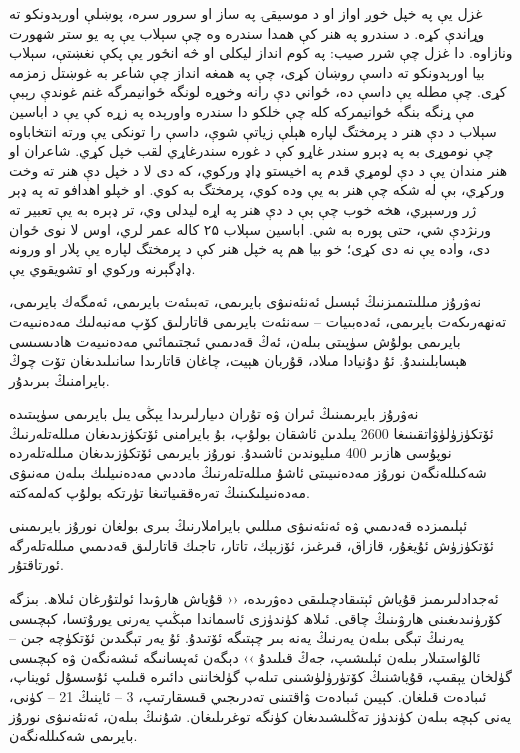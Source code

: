 \documentclass[a4paper]{article}
\begin{document}
\begin{flushright}
غزل یې په خپل خوږ اواز او د موسیقۍ په ساز او سرور سره، پوښلې اورېدونکو ته وړاندې کړه. د سندرو په هنر کې همدا سندره وه چې سېلاب یې په یو ستر شهورت ونازاوه. دا غزل چې شرر صیب: په کوم انداز لیکلی او څه انځور یې پکې نغښتې، سېلاب بیا اورېدونکو ته داسې روښان کړی، چې په همغه انداز چې شاعر به غوښتل زمزمه کړی. چې مطله یې داسې ده، ځواني دې رانه وخوړه لونگه ځوانیمرگه غنم غوندې رېبې مې ړنگه بنگه ځوانیمرکه کله چې خلکو دا سندره واورېده په زړه کې یې د اباسین سېلاب د دې هنر د پرمختگ لپاره هېلې زیاتې شوې، داسې را تونکی یې ورته انتخاباوه چې نوموړی به په ډېرو سندر غاړو کې د غوره سندرغاړي لقب خپل کړي. شاعران او هنر مندان یې د دې لومړي قدم په اخیستو ډاډ ورکوي، که دی لا د خپل دې هنر ته وخت ورکړي، بې له شکه چې هنر به یې وده کوي، پرمختگ به کوي. او خپلو اهدافو ته په ډېر ژر ورسېږي، هخه خوب چې ېې د دې هنر په اړه لیدلی وي، تر ډېره به یې تعبیر ته ورنژدې شي، حتی پوره به شي. اباسین سېلاب ۲۵ کاله عمر لري، اوس لا نوی ځوان دی، واده یې نه دی کړی؛ خو بیا هم په خپل هنر کې د پرمختگ لپاره یې پلار او ورونه ډاډگېرنه ورکوي او تشویقوي یې.

نەۋرۇز مىللىتىمىزنىڭ ئېسىل ئەنئەنىۋى بايرىمى، تەبىئەت بايرىمى، ئەمگەك بايرىمى، تەنھەرىكەت بايرىمى، ئەدەبىيات – سەنئەت بايرىمى قاتارلىق كۆپ مەنبەلىك مەدەنىيەت بايرىمى بولۇش سۈپىتى بىلەن، ئەڭ قەدىمىي ئىجتىمائىي مەدەنىيەت ھادىسىسى ھېسابلىنىدۇ. ئۇ دۇنيادا مىلاد، قۇربان ھېيت، چاغان قاتارىدا سانىلىدىغان تۆت چوڭ بايرامنىڭ بىرىدۇر.



نەۋرۇز بايرىمىنىڭ ئىران ۋە تۇران دىيارلىرىدا يېڭى يىل بايرىمى سۈپىتىدە ئۆتكۈزۈلۈۋاتقىنىغا 2600 يىلدىن ئاشقان بولۇپ، بۇ بايرامنى ئۆتكۈزىدىغان مىللەتلەرنىڭ نوپۇسى ھازىر 400 مىليوندىن ئاشىدۇ. نورۇز بايرىمى ئۆتكۈزىدىغان مىللەتلەردە شەكىللەنگەن نورۇز مەدەنىيىتى ئاشۇ مىللەتلەرنىڭ ماددىي مەدەنىيلىك بىلەن مەنىۋى مەدەنىيلىكىنىڭ تەرەققىياتىغا تۈرتكە بولۇپ كەلمەكتە.



ئېلىمىزدە قەدىمىي ۋە ئەنئەنىۋى مىللىي بايراملارنىڭ بىرى بولغان نورۇز بايرىمىنى ئۆتكۈزۈش ئۇيغۇر، قازاق، قىرغىز، ئۆزبېك، تاتار، تاجىك قاتارلىق قەدىمىي مىللەتلەرگە ئورتاقتۇر.



ئەجدادلىرىمىز قۇياش ئېتىقادچىلىقى دەۋرىدە، ‹‹ قۇياش ھارۋىدا ئولتۇرغان ئىلاھ. بىزگە كۆرۈنىدىغىنى ھارۋىنىڭ چاقى. ئىلاھ كۈندۈزى ئاسماندا مېڭىپ يەرنى يورۇتسا، كېچىسى يەرنىڭ تېگى بىلەن يەرنىڭ يەنە بىر چېتىگە ئۆتىدۇ. ئۇ يەر تېگىدىن ئۆتكۈچە جىن – ئالۋاستىلار بىلەن ئېلىشىپ، جەڭ قىلىدۇ ›› دېگەن ئەپسانىگە ئىشەنگەن ۋە كېچىسى گۈلخان يېقىپ، قۇياشنىڭ كۆتۈرۈلۈشىنى تىلەپ گۈلخاننى دائىرە قىلىپ ئۇسسۇل ئويناپ، ئىبادەت قىلغان. كېيىن ئىبادەت ۋاقتىنى تەدرىجىي قىسقارتىپ، 3 – ئاينىڭ 21 – كۈنى، يەنى كېچە بىلەن كۈندۈز تەڭلىشىدىغان كۈنگە توغرىلىغان. شۇنىڭ بىلەن، ئەنئەنىۋى نورۇز بايرىمى شەكىللەنگەن.




\end{flushright}
\end{document}

